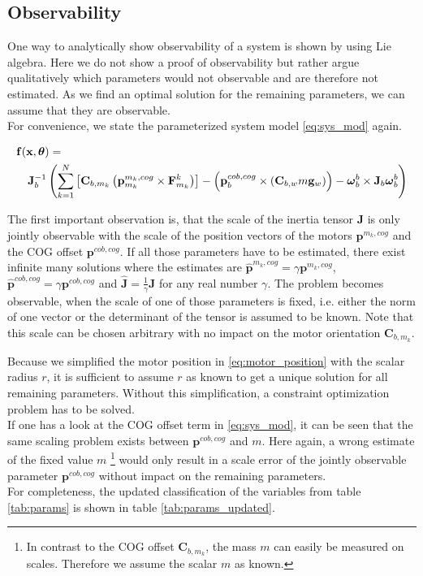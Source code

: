 \subsection{Observability}
\label{sub:observability}
One way to analytically show observability of a system is shown by \citet{hermann1977} using Lie algebra. 
Here we do not show a proof of observability but rather argue qualitatively which parameters would not observable and are therefore not estimated.
As we find an optimal solution for the remaining parameters, we can assume that they are observable.
\\
For convenience, we state the parameterized system model \eqref{eq:sys_mod} again.

\begin{eqnarray*}
\lefteqn{
\mathbf{f}(\mathbf{x}, \boldsymbol{\theta}) = {}} \\
& & {} \mathbf{J}_b^{-1} \left( 
\sum_{k=1}^N  \left[  \mathbf{C}_{b,m_k} \left( \mathbf{p}^{m_k,cog}_{m_k} \times \mathbf{F}^k_{m_k} \right)  \right]
-
\left( \mathbf{p}^{cob,cog}_b \times (\mathbf{C}_{b,w}m\mathbf{g}_w) \right)
- \boldsymbol{\omega}_b^b \times \mathbf{J}_b \boldsymbol{\omega}_b^b \right)
\end{eqnarray*}

The first important observation is, that the scale of the inertia tensor $\mathbf{J}$ is only jointly observable with the scale of the position vectors of the motors $\mathbf{p}^{m_k,cog}$ and the COG offset $\mathbf{p}^{cob,cog}$.
If all those parameters have to be estimated, there exist infinite many solutions where the estimates are $\hat{\mathbf{p}}^{m_k,cog} = \gamma \mathbf{p}^{m_k,cog}$, 
$\hat{\mathbf{p}}^{cob,cog} = \gamma \mathbf{p}^{cob,cog}$ and 
$\hat{\mathbf{J}}           = \frac{1}{\gamma} \mathbf{J}$
for any real number $\gamma$.
The problem becomes observable, when the scale of one of those parameters is fixed, i.e. either the norm of one vector or the determinant of the tensor is assumed to be known.
Note that this scale can be chosen arbitrary with no impact on the motor orientation $\mathbf{C}_{b,m_k}$.

Because we simplified the motor position in \eqref{eq:motor_position} with the scalar radius $r$, it is sufficient to assume $r$ as known to get a unique solution for all remaining parameters.
Without this simplification, a constraint optimization problem has to be solved.
\\

If one has a look at the COG offset term in \eqref{eq:sys_mod}, it can be seen that the same scaling problem exists between $\mathbf{p}^{cob,cog}$ and $m$.
Here again, a wrong estimate of the fixed value $m$
\footnote{In contrast to the COG offset $\mathbf{C}_{b,m_k}$, the mass $m$ can easily be measured on scales. Therefore we assume the scalar $m$ as known.}
would only result in a scale error of the jointly observable parameter $\mathbf{p}^{cob,cog}$ without impact on the remaining parameters.
\\
For completeness, the updated classification of the variables from table \ref{tab:params} is shown in table \ref{tab:params_updated}.

